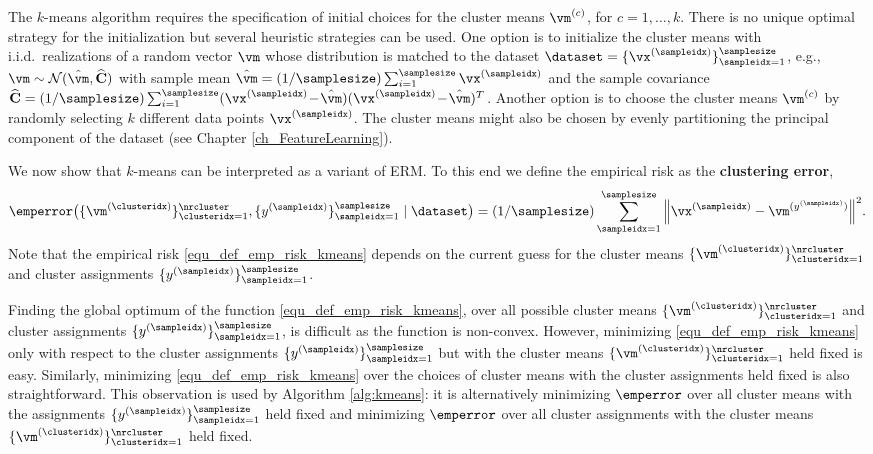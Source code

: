 \documentclass[12pt]{report}
\begin{document}
The $k$-means algorithm requires the specification of initial choices 
for the cluster means $\vm^{(c)}$, for $c=1,\ldots,k$. There is no unique 
optimal strategy for the initialization but several heuristic strategies 
can be used. One option is to initialize the cluster means with i.i.d.\ 
realizations of a random vector $\vm$ whose distribution is matched 
to the dataset $\dataset = \{ \vx^{(\sampleidx)} \}_{\sampleidx=1}^{\samplesize}$, 
e.g., $\vm \sim \mathcal{N}( \hat{\vm}, \widehat{\mathbf{C}})$ with 
sample mean $\hat{\vm} = (1/\samplesize) \sum_{i=1}^{\samplesize} \vx^{(\sampleidx)}$ 
and the sample covariance $\widehat{\mathbf{C}} = (1/\samplesize) \sum_{i=1}^{\samplesize} (\vx^{(\sampleidx)}\!-\!\hat{\vm}) (\vx^{(\sampleidx)}\!-\!\hat{\vm})^{T}$. Another option is to choose the 
cluster means $\vm^{(c)}$ by randomly selecting $k$ different data 
points $\vx^{(\sampleidx)}$. The cluster means might also be chosen 
by evenly partitioning the principal component of the dataset 
(see Chapter \ref{ch_FeatureLearning}). 

We now show that $k$-means can be interpreted as a variant of ERM. 
To this end we define the empirical risk as the {\bf clustering error}, 
\begin{equation}
\label{equ_def_emp_risk_kmeans}
\vspace*{-2mm}
 \emperror \big( \{\vm^{(\clusteridx)}\}_{\clusteridx=1}^{\nrcluster},\{y^{(\sampleidx)}\}_{\sampleidx=1}^{\samplesize} \mid \dataset \big)
=(1/\samplesize) \sum_{\sampleidx=1}^{\samplesize} {\left\|\vx^{(\sampleidx)}-\vm^{(y^{(\sampleidx)})}\right\|^2}.
\end{equation} 
Note that the empirical risk \eqref{equ_def_emp_risk_kmeans} depends 
on the current guess for the cluster means $\{ \vm^{(\clusteridx)} \}_{\clusteridx=1}^{\nrcluster}$ 
and cluster assignments $\{ y^{(\sampleidx)} \}_{\sampleidx=1}^{\samplesize}$. 

Finding the global optimum of the function \eqref{equ_def_emp_risk_kmeans}, 
over all possible cluster means $\{\vm^{(\clusteridx)}\}_{\clusteridx=1}^{\nrcluster}$ 
and cluster assignments $\{y^{(\sampleidx)}\}_{\sampleidx=1}^{\samplesize}$, 
is difficult as the function is non-convex. However, minimizing \eqref{equ_def_emp_risk_kmeans} 
only with respect to the cluster assignments $\{y^{(\sampleidx)}\}_{\sampleidx=1}^{\samplesize}$ 
but with the cluster means $\{\vm^{(\clusteridx)}\}_{\clusteridx=1}^{\nrcluster}$ 
held fixed is easy. Similarly, minimizing \eqref{equ_def_emp_risk_kmeans} over the 
choices of cluster means with the cluster assignments held fixed is also straightforward. 
This observation is used by Algorithm \ref{alg:kmeans}:  it is alternatively minimizing 
$\emperror$ over all cluster means with the assignments $\{ y^{(\sampleidx)} \}_{\sampleidx=1}^{\samplesize}$ 
held fixed and minimizing $\emperror$ over all cluster assignments with the 
cluster means $\{ \vm^{(\clusteridx)} \}_{\clusteridx=1}^{\nrcluster}$ held fixed. 
\end{document}
